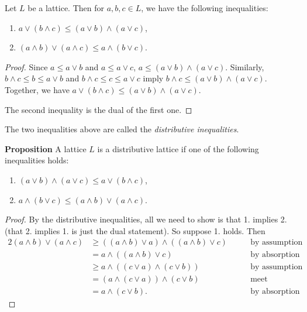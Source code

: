 \documentclass[12pt]{article}
\begin{document}
Let $L$ be a lattice.  Then for $a,b,c\in L$, we have the following inequalities:

\begin{enumerate}
\item $a\vee (b\wedge c)\le (a\vee b)\wedge (a\vee c)$,
\item $(a\wedge b)\vee (a\wedge c)\le a\wedge (b\vee c)$.
\end{enumerate}

\begin{proof}
Since $a\le a\vee b$ and $a\le a\vee c$, $a\le (a\vee b)\wedge (a\vee c)$.
Similarly, $b\wedge c \le b\le a\vee b$ and $b\wedge c\le c\le a\vee c$ imply 
$b\wedge c\le (a\vee b)\wedge (a\vee c)$.
Together, we have $a\vee (b\wedge c)\le (a\vee b)\wedge (a\vee c)$.

The second inequality is the dual of the first one.
\end{proof}

The two inequalities above are called the \emph{distributive inequalities}.

\textbf{Proposition}  A lattice $L$ is a distributive lattice if one of the following inequalities holds:
\begin{enumerate}
\item $(a\vee b)\wedge (a\vee c)\le a\vee (b\wedge c)$,
\item $a\wedge (b\vee c)\le (a\wedge b)\vee (a\wedge c)$.
\end{enumerate}

\begin{proof}
By the distributive inequalities, all we need to show is that 1. implies 2.  (that 2. implies 1. is just the dual statement).  So suppose 1. holds.  Then 
\begin{alignat*}{2}
(a\wedge b)\vee (a\wedge c) &\ge ((a\wedge b)\vee a)\wedge ((a\wedge b)\vee c) & \qquad\mbox{by assumption}\\ 
&= a \wedge ((a\wedge b)\vee c) & \qquad\mbox{by absorption}\\ 
&\ge a\wedge ((c\vee a)\wedge (c\vee b)) & \qquad\mbox{by assumption}\\ 
&= (a\wedge (c\vee a))\wedge (c\vee b) & \qquad\mbox{meet associativity}\\ 
&= a \wedge (c\vee b). & \qquad\mbox{by absorption}
\end{alignat*}
\end{proof}
\end{document}
